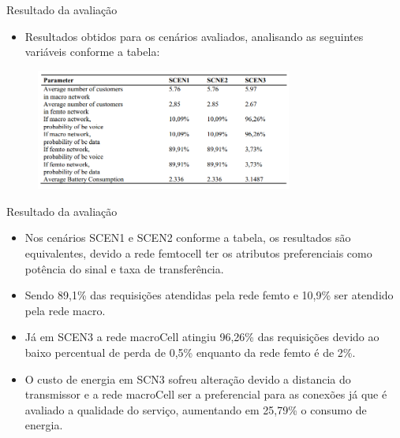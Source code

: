 \begin{frame}{Resultado da avaliação}
  \begin{itemize}
    \item Resultados obtidos para os cenários avaliados, analisando as seguintes variáveis conforme a tabela:
  \end{itemize}
  \begin{figure}
    \includegraphics [width=0.75\textwidth]{./Figures/val_3}
  \end{figure}
\end{frame}

\begin{frame}
  \begin{block}{Resultado da avaliação}
    \begin{itemize}
      \item \footnotesize Nos cenários SCEN1 e SCEN2 conforme a tabela, os resultados são equivalentes, devido a rede femtocell ter os atributos preferenciais como potência do sinal e taxa de transferência.
      \newline
      \item \footnotesize Sendo \alert{89,1\%} das requisições atendidas pela rede femto e \alert{10,9\%} ser atendido pela rede macro.
      \newline
      \item \footnotesize Já em SCEN3 a rede macroCell atingiu \alert{96,26\%} das requisições devido ao baixo percentual de perda de \alert{0,5\%} enquanto da rede femto é de \alert{2\%}.
      \newline
      \item \footnotesize O custo de energia em SCN3 sofreu alteração devido a distancia do transmissor e a rede macroCell ser a preferencial para as conexões já que é avaliado a qualidade do serviço, aumentando em \alert{25,79\%} o consumo de energia.
    \end{itemize}
  \end{block}
\end{frame}
